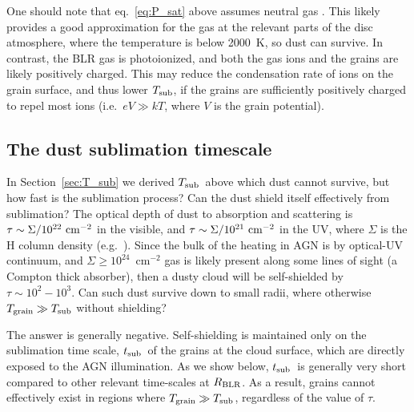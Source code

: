 \documentclass[a4paper,fleqn,usenatbib]{mnras}
\newcommand{\Tsub}{\mbox{$T_{\rm sub}$}}
\newcommand{\tsub}{\mbox{$t_{\rm sub}$}}
\newcommand{\Tgr}{\mbox{$T_{\rm grain}$}}
\begin{document}
		

One should note that eq.~\ref{eq:P_sat} above assumes neutral gas \citep{guhathakurta_draine89}. This likely provides
a good approximation for the gas at the relevant parts of the disc atmosphere, where the temperature is below
2000~K, so dust can survive. In contrast, the BLR gas is photoionized, and both the gas ions and the grains are likely 
positively charged.
This may reduce the condensation rate of ions on the grain surface, and thus lower \Tsub, if the 
grains are sufficiently positively charged to repel most ions (i.e.\ $eV\gg kT$, where $V$ is the grain
potential).
		
\subsection{The dust sublimation timescale} \label{sec:dust_sub}

In Section~\ref{sec:T_sub} we derived \Tsub\ above which dust cannot survive, but how fast is the sublimation process? 
Can the dust shield itself effectively from sublimation?
The optical depth of dust to absorption and scattering is $\tau\sim \Sigma/10^{22}~{\rm cm}^{-2}$ in the visible, and $\tau\sim \Sigma/10^{21}~{\rm cm}^{-2}$ in the UV,
where $\Sigma$ is the H column density (e.g.\ \citealt{LaorDraine93}). Since the bulk of the heating in AGN is by optical-UV
continuum, and $\Sigma\ge 10^{24}$~cm$^{-2}$ gas is likely present along some lines of sight 
(a Compton thick absorber), then a dusty cloud will be self-shielded
by $\tau\sim 10^2-10^3$. Can such dust survive down to small radii, where otherwise $\Tgr\gg \Tsub$ without shielding?

The answer is generally negative. Self-shielding is maintained only on
the sublimation time scale, \tsub\ of the grains at the cloud surface, which are directly exposed to the AGN illumination. 
As we show below, \tsub\ is generally very short 
compared to other relevant time-scales at $R_{\rm BLR}$. As a result, grains cannot effectively exist in regions where
$\Tgr\gg \Tsub$, regardless of the value of $\tau$. 
\end{document}
